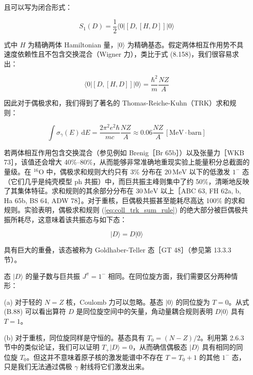 且可以写为闭合形式：

\begin{equation}
S_{1}(D)=\frac{1}{2}\langle0|[D,[H,D]]|0\rangle\label{eq:coll_double_commutator_dipole}
\end{equation}

式中 $H$ 为精确两体 Hamiltonian 量，$|0\rangle$ 为精确基态。假定两体相互作用势不具速度依赖性且不包含交换混合（Wigner
力），类比于式 (8.158)，我们很容易求出：

\begin{equation}
\langle0|[D,[H,D]]|0\rangle=\frac{\hbar^{2}}{m}\frac{NZ}{A}\label{eq:coll_tr_sum_rule_eval}
\end{equation}

因此对于偶极求和，我们得到了著名的 Thomas-Reiche-Kuhn（TRK）求和规则：

\begin{equation}
\int\sigma_{\gamma}(E)\,\mathrm{d}E=\frac{2\pi^{2}e^{2}\hbar}{mc}\frac{NZ}{A}\approx0.06\frac{NZ}{A}\,[\text{MeV}\cdot\text{barn}]\label{eq:coll_trk_sum_rule}
\end{equation}

若两体相互作用包含交换混合（参见例如 Brenig［Br 65b］）以及张量力［WKB 73］，该值还会增大 40\%–80\%，从而能够非常准确地重现实验上能量积分总截面的量级。在
$^{16}\mathrm{O}$ 中，偶极求和规则大约只有 3\% 分布在 $20\,\text{MeV}$ 以下的低激发 $1^{-}$
态（它们几乎是纯壳模型 ph 共振）中，而巨共振主峰则集中了约 50\%，清晰地反映了其集体特征。求和规则的其余部分分布在 $30\,\text{MeV}$
以上［ABC 63, FH 62a, b, Ha 65b, BS 64, ADW 78］。对于重核，巨偶极共振甚至能耗尽高达 100\%
的求和规则。实验表明，偶极求和规则 (\ref{eq:coll_trk_sum_rule}) 的绝大部分被巨偶极共振所耗尽，这意味着该共振态与如下态：

\begin{equation}
|D\rangle=D|0\rangle\label{eq:coll_goldhaber_teller_state}
\end{equation}

具有巨大的重叠，该态被称为 Goldhaber-Teller 态［GT 48］（参见第 13.3.3 节）。

态 $|D\rangle$ 的量子数与巨共振 $J^{\pi}=1^{-}$ 相同。在同位旋方面，我们需要区分两种情形：

(a) 对于轻的 $N=Z$ 核，Coulomb 力可以忽略。基态 $|0\rangle$ 的同位旋为 $T=0$。从式 (B.88)
可以看出算符 $D$ 是同位旋空间中的矢量，角动量耦合规则表明 $D|0\rangle$ 具有 $T=1$。

(b) 对于重核，同位旋同样是守恒的。基态具有 $T_{0}=(N-Z)/2$。利用第 2.6.3 节中的类似论证，我们可以证明
$T_{+}|D\rangle=0$，从而确信偶极态 $|D\rangle$ 具有相同的同位旋 $T_{0}$。但这并不意味着原子核的激发能谱中不存在
$T=T_{0}+1$ 的其他 $1^{-}$ 态，只是我们无法通过偶极 $\gamma$ 射线将它们激发出来。

